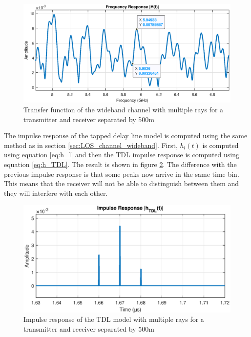 \documentclass[10pt,a4paper]{ULBreport}
\begin{document}
\begin{figure}
    \centering
    \includegraphics[width=1\textwidth]{5_2.eps}
    \caption{Transfer function of the wideband channel with multiple rays for a transmitter and receiver separated by 500m}
    \label{fig:transfer_function_full}
\end{figure}

The impulse response of the tapped delay line model is computed using the same method as in section \ref{sec:LOS_channel_wideband}. First, $h_l(t)$ is computed using equation \ref{eq:h_l} and then the TDL impulse response is computed using equation \ref{eq:h_TDL}. The result is shown in figure \ref{fig:impulse_response_TDL}. The difference with the previous impulse response is that some peaks now arrive in the same time bin. This means that the receiver will not be able to distinguish between them and they will interfere with each other. 

\begin{figure}
    \centering
    \includegraphics[width=1\textwidth]{5_3.eps}
    \caption{Impulse response of the TDL model with multiple rays for a transmitter and receiver separated by 500m}
    \label{fig:impulse_response_TDL}
\end{figure}
\end{document}
